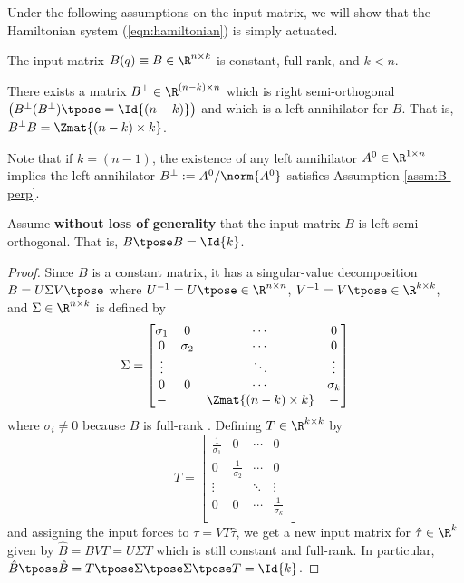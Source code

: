 Under the following assumptions on the input matrix, we will show that the
Hamiltonian system (\ref{eqn:hamiltonian}) is simply actuated.

\begin{assm}\label{assm:B-const}
    The input matrix \(B(q) \equiv B \in \R^{n\times k}\) is constant,
    full rank, and \(k < n\).
\end{assm}
\begin{assm}\label{assm:B-perp}
    There exists a matrix 
    \(B^\perp \in \R^{(n-k)\times n}\)
    which is right semi-orthogonal 
    \(\left(B^\perp(B^\perp)\tpose = \Id{(n-k)}\right)\)
    and which is a left-annihilator for \(B\). 
    That is, \(B^\perp B = \Zmat{(n-k) \times k}\).
\end{assm}

Note that if \(k = (n-1)\), the existence of any left annihilator 
\(A^0 \in \R^{1\times n}\) implies the left annihilator 
\(B^\perp := A^0/\norm{A^0}\) satisfies Assumption \ref{assm:B-perp}.

\begin{assm}\label{assm:B-orthogonal}
    Assume \textbf{without loss of generality} that the input matrix \(B\) is
    left semi-orthogonal. That is, \(B\tpose B = \Id{k}\).
\end{assm}
\begin{proof}
Since \(B\) is a constant matrix, 
it has a singular-value decomposition 
\(B = U \Sigma V\tpose\) where \(U^{-1} = U\tpose \in \R^{n \times n}\), 
\(V^{-1} = V\tpose \in \R^{k \times k}\), and \(\Sigma \in \R^{n \times k}\) is
defined by
\[
    \Sigma = \begin{bmatrix}
        \sigma_1 & 0 & \cdots & 0 \\
        0 & \sigma_2 & \cdots & 0 \\
        \vdots & & \ddots & \vdots \\
        0 & 0 & \cdots & \sigma_k \\
        - &   & \Zmat{(n-k)\times k} & -  \\
    \end{bmatrix}
\]
where \(\sigma_i \neq 0\) because \(B\) is full-rank \cite{calculating_svd}.
Defining \(T \in \R^{k \times k}\) by
\[
    T = \begin{bmatrix}
        \frac{1}{\sigma_1} & 0 & \cdots & 0 \\
        0 & \frac{1}{\sigma_2} & \cdots & 0 \\
    \vdots & & \ddots & \vdots \\
    0 & 0 & \cdots & \frac{1}{\sigma_k} \\
    \end{bmatrix}
\]
and assigning the input forces to \(\tau = V T \hat{\tau}\), we get a new input
matrix for \(\hat{\tau} \in \R^k\) given by \(\hat{B} = B V T = U \Sigma T\) 
which is still constant and full-rank. In particular, 
\(\hat{B}\tpose \hat{B} = T\tpose \Sigma\tpose \Sigma\tpose T = \Id{k}\).
\end{proof}


